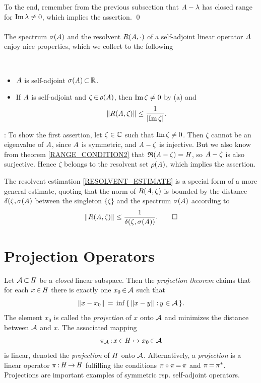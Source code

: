 \documentclass[11pt,twoside]{article}
\begin{document}
To the end,
remember from the previous subsection
that $\mathit{A}-\lambda$ has closed range for $\operatorname{Im} \lambda \neq 0$,
which implies the assertion.
\qed

\paragraph{}
The spectrum $\sigma(\mathit{A})$ and the resolvent $R(\mathit{A},\cdot)$
of a self-adjoint linear operator $\mathit{A}$ enjoy nice properties,
which we collect to the following

\begin{theorem}
\,
\begin{itemize}[leftmargin=22pt]
\item[(a)]
$\mathit{A}$ is self-adjoint \iff $\sigma(\mathit{A}) {\,\subset\,} {\mathbb{R}}$.
\item[(b)]
If $\mathit{A}$ is self-adjoint and $\zeta {\,\in\,} \rho(\mathit{A})$,
then $\operatorname{Im} \zeta \neq 0$ by (a) and
\begin{equation}\label{RESOLVENT_ESTIMATE}
\norm{R(\linA,\zeta)} \leq \frac{1}{\abs{\im \zeta} }.
\end{equation}
\end{itemize}
\end{theorem}

\Proof:
To show the first assertion,
let $\zeta \in {\mathbb{C}}$ such that $\operatorname{Im} \zeta \neq 0$.
Then $\zeta$ cannot be an eigenvalue of $\mathit{A}$, since $\mathit{A}$ is symmetric,
and $\mathit{A}-\zeta$ is injective.
But we also know from theorem \ref{RANGE_CONDITION2}
that $\mathfrak{R}(\mathit{A}-\zeta) = \mathit{H}$,
so $\mathit{A}-\zeta$ is also surjective.
Hence $\zeta$ belongs to the resolvent set $\rho(\mathit{A})$,
which implies the assertion.

The resolvent estimation \eqref{RESOLVENT_ESTIMATE} is a special form
of a more general estimate,
quoting that the norm of $R(\mathit{A},\zeta)$ is bounded by the distance
$\delta(\zeta,\sigma(\mathit{A})$
between the singleton $\{\zeta\}$ and the spectrum $\sigma(\mathit{A})$
according to
\[
\left\lVert R(\mathit{A},\zeta) \right\rVert \leq \frac{1}{\delta(\zeta,\sigma(\mathit{A}))}.
\qed
\]

\section{Projection Operators}                                                 %
Let $\mathcal{A} {\,\subset\,} \mathit{H}$ be a \textit{closed} linear subspace.
Then the \textit{projection theorem} claims that
for each $x {\,\in\,} \mathit{H}$ there is exactly one $x_0 {\,\in\,} \mathcal{A}$
such that
\[
\left\lVert  x - x_0  \right\rVert \,=\, \inf \, \{ \, \left\lVert x-y \right\rVert {\,:\,} y \in \mathcal{A} \,\}.
\]
The element $x_0$ is called the \textit{projection} of $x$ onto $\mathcal{A}$
and minimizes the distance between $\mathcal{A}$ and $x$.
The associated mapping
\[
\pi_{\mathcal{A}} {\,:\,} x {\,\in\,} \mathit{H} \mapsto x_0 {\,\in\,} \mathcal{A}
\]
is linear,
denoted the \textit{projection} of $\mathit{H}$ onto $\mathcal{A}$.
Alternatively,
a \textit{projection} is a linear operator
$\pi {\,:\,}\mathit{H} {\,\to\,} \mathit{H}$ fulfilling the conditions $\pi  \circ \pi  {\,=\,} \pi $
and $\pi {\,=\,} \pi ^*$.
Projections are important examples of symmetric rsp. self-adjoint operators.
\end{document}
